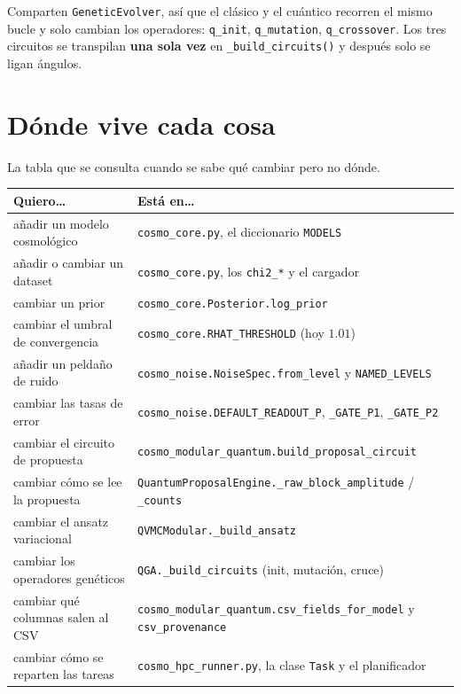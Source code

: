 \documentclass[11pt,a4paper]{article}
\newcommand{\M}[1]{\texttt{#1}}
\begin{document}
Comparten \M{GeneticEvolver}, así que el clásico y el cuántico recorren el
mismo bucle y solo cambian los operadores: \M{q\_init}, \M{q\_mutation},
\M{q\_crossover}. Los tres circuitos se transpilan \textbf{una sola vez} en
\M{\_build\_circuits()} y después solo se ligan ángulos.

\section{Dónde vive cada cosa}

La tabla que se consulta cuando se sabe qué cambiar pero no dónde.

\begin{center}
\small
\begin{longtable}{@{}p{7.1cm}p{7.6cm}@{}}
\toprule
\textbf{Quiero\ldots} & \textbf{Está en\ldots} \\
\midrule
\endhead
añadir un modelo cosmológico
  & \M{cosmo\_core.py}, el diccionario \M{MODELS} \\
añadir o cambiar un dataset
  & \M{cosmo\_core.py}, los \M{chi2\_*} y el cargador \\
cambiar un prior
  & \M{cosmo\_core.Posterior.log\_prior} \\
cambiar el umbral de convergencia
  & \M{cosmo\_core.RHAT\_THRESHOLD} (hoy $1.01$) \\
\addlinespace
añadir un peldaño de ruido
  & \M{cosmo\_noise.NoiseSpec.from\_level} y \M{NAMED\_LEVELS} \\
cambiar las tasas de error
  & \M{cosmo\_noise.DEFAULT\_READOUT\_P}, \M{\_GATE\_P1}, \M{\_GATE\_P2} \\
\addlinespace
cambiar el circuito de propuesta
  & \M{cosmo\_modular\_quantum.build\_proposal\_circuit} \\
cambiar cómo se lee la propuesta
  & \M{QuantumProposalEngine.\_raw\_block\_amplitude} / \M{\_counts} \\
cambiar el ansatz variacional
  & \M{QVMCModular.\_build\_ansatz} \\
cambiar los operadores genéticos
  & \M{QGA.\_build\_circuits} (init, mutación, cruce) \\
\addlinespace
cambiar qué columnas salen al CSV
  & \M{cosmo\_modular\_quantum.csv\_fields\_for\_model} y
    \M{csv\_provenance} \\
cambiar cómo se reparten las tareas
  & \M{cosmo\_hpc\_runner.py}, la clase \M{Task} y el planificador \\
\bottomrule
\end{longtable}
\end{center}
\end{document}
